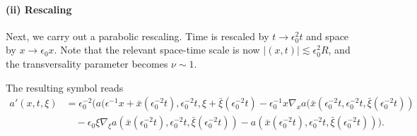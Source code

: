 \documentclass{amsart}
\theoremstyle{definition}
\begin{document}
\bigskip

\paragraph{\textbf{(ii) Rescaling}}

Next, we carry out a parabolic rescaling. Time is rescaled by $t \to \epsilon_0^2 t$ and space by $x \to \epsilon_0 x$. Note that the relevant space-time scale is now $|(x,t)| \lesssim \epsilon_0^2 R$, and the transversality parameter becomes $\nu \sim 1$.

The resulting symbol reads
\begin{equation*}
\begin{split}
a'(x,t,\xi) &= \epsilon_0^{-2} (a(\epsilon^{-1} x+ \bar{x}(\epsilon_0^{-2} t),\epsilon_0^{-2}t,\xi + \bar{\xi}(\epsilon_0^{-2} t) - \epsilon_0^{-1} x \nabla_x a(\bar{x}(\epsilon_0^{-2} t, \epsilon_0^{-2} t, \bar{\xi}(\epsilon_0^{-2} t)) \\
&\quad - \epsilon_0 \xi \nabla_{\xi} a(\bar{x}(\epsilon_0^{-2} t),\epsilon_0^{-2} t, \bar{\xi}(\epsilon_0^{-2} t)) - a(\bar{x}(\epsilon_0^{-2} t),\epsilon_0^{-2} t, \bar{\xi}(\epsilon_0^{-2} t))).
\end{split}
\end{equation*}
\end{document}
